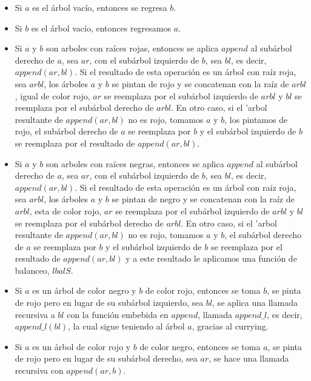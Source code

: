 \documentclass[letterpaper,12pt,oneside]{book}
\theoremstyle{plain}
\theoremstyle{definition}
\theoremstyle{remark}
\begin{document}
\begin{itemize}
    \item Si $a$ es el \'arbol vacío, entonces se regresa $b$.
    \item Si $b$ es el \'arbol vacío, entonces regresamos $a$.
    \item Si $a$ y $b$ son arboles con raíces rojas, entonces se aplica $append$ al subárbol derecho 
    de $a$, sea $ar$, con el subárbol izquierdo de $b$, sea $bl$, es decir, $append(ar,bl)$. Si el 
    resultado de esta operación es un árbol con raíz roja, sea $arbl$, los \'arboles $a$ y $b$ se 
    pintan de rojo y se concatenan con la raíz de $arbl$, igual de color rojo, $ar$ se reemplaza por 
    el subárbol izquierdo de $arbl$ y $bl$ se reemplaza por el subárbol derecho de $arbl$.
    En otro caso, si el 'arbol resultante de $append(ar,bl)$ no es rojo, tomamos $a$ y $b$, los 
    pintamos de rojo, el subárbol derecho de $a$ se reemplaza por $b$ y el subárbol izquierdo de $b$ 
    se reemplaza por el resultado de $append(ar,bl)$.
    \item Si $a$ y $b$ son arboles con raíces negras, entonces se aplica $append$ al subárbol derecho
    de $a$, sea $ar$, con el subárbol izquierdo de $b$, sea $bl$, es decir, $append(ar,bl)$. Si el 
    resultado de esta operación es un árbol con raíz roja, sea $arbl$, los \'arboles $a$ y $b$ se 
    pintan de negro y se concatenan con la raíz de $arbl$, esta de color rojo, $ar$ se reemplaza por
    el subárbol izquierdo de $arbl$ y $bl$ se reemplaza por el subárbol derecho de $arbl$.
    En otro caso, si el 'arbol resultante de $append(ar,bl)$ no es rojo, tomamos $a$ y $b$, el subárbol derecho de $a$ se reemplaza por $b$ y el subárbol izquierdo de $b$ se reemplaza por el resultado de $append(ar,bl)$ y a este resultado le aplicamos una función de balanceo, $lbalS$.
    \item Si $a$ es un \'arbol de color negro y $b$ de color rojo, entonces se toma $b$, se pinta de rojo pero en lugar de su subárbol izquierdo, sea $bl$, se aplica una llamada recursiva a $bl$ con la  funci\'on embebida en $append$, llamada $append\_l$, es decir, $append\_l(bl)$, la cual sigue teniendo al \'arbol $a$, gracias al currying\cite{Currying}.
    \item Si $a$ es un \'arbol de color rojo y $b$ de color negro, entonces se toma $a$, se pinta de rojo pero en lugar de su subárbol derecho, sea $ar$, se hace una llamada recursiva con $append(ar,b)$.
\end{itemize}
\end{document}
